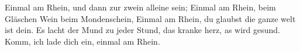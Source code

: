\beginverse*
Einmal am Rhein, und dann zur zwein alleine sein;
Einmal am Rhein, beim Gläschen Wein beim Mondenschein,
Einmal am Rhein, du glaubst die ganze welt ist dein.
Es lacht der Mund zu jeder Stund, das kranke herz, as wird gesund.
Komm, ich lade dich ein, einmal am Rhein.
\endverse
\endsong
